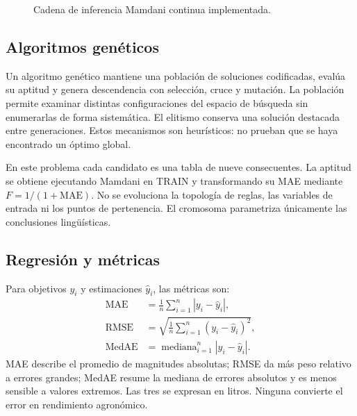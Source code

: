 \documentclass[11pt,letterpaper]{article}
\newcommand{\MAE}{\mathrm{MAE}}
\newcommand{\RMSE}{\mathrm{RMSE}}
\newcommand{\MedAE}{\mathrm{MedAE}}
\begin{document}
\begin{figure}[H]
\centering
{}
\caption{Cadena de inferencia Mamdani continua implementada.}\label{fig:cadena-mamdani}
\end{figure}

\subsection{Algoritmos genéticos}
Un algoritmo genético mantiene una población de soluciones codificadas, evalúa su aptitud y genera descendencia con selección, cruce y mutación. La población permite examinar distintas configuraciones del espacio de búsqueda sin enumerarlas de forma sistemática. El elitismo conserva una solución destacada entre generaciones. Estos mecanismos son heurísticos: no prueban que se haya encontrado un óptimo global.

En este problema cada candidato es una tabla de nueve consecuentes. La aptitud se obtiene ejecutando Mamdani en TRAIN y transformando su MAE mediante $F=1/(1+\MAE)$. No se evoluciona la topología de reglas, las variables de entrada ni los puntos de pertenencia. El cromosoma parametriza únicamente las conclusiones lingüísticas.

\subsection{Regresión y métricas}
Para objetivos $y_i$ y estimaciones $\widehat y_i$, las métricas son:
\begin{align}
  \MAE &= \frac{1}{n}\sum_{i=1}^{n}|y_i-\widehat y_i|,\\
  \RMSE &= \sqrt{\frac{1}{n}\sum_{i=1}^{n}(y_i-\widehat y_i)^2},\\
  \MedAE &= \operatorname{mediana}_{i=1}^{n}|y_i-\widehat y_i|.
\end{align}
MAE describe el promedio de magnitudes absolutas; RMSE da más peso relativo a errores grandes; MedAE resume la mediana de errores absolutos y es menos sensible a valores extremos. Las tres se expresan en litros. Ninguna convierte el error en rendimiento agronómico.
\end{document}
